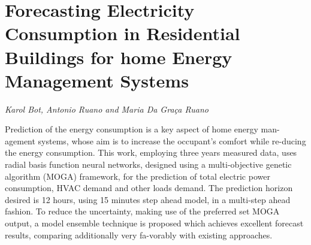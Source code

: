 \documentclass[../booklet.tex]{subfiles}
\begin{document}
\section[Forecasting Electricity Consumption in Residential Buildings for home Energy Management Systems. {\it Karol Bot, Antonio Ruano and Maria Da Graça Ruano}]{Forecasting Electricity Consumption in Residential Buildings for home Energy Management Systems}
  

\begin{center}
  {\it Karol Bot, Antonio Ruano and Maria Da Graça Ruano}
\end{center}

\vskip 0.8cm

Prediction of the energy consumption is a key aspect of home energy man-agement systems, whose aim is to increase the occupant's comfort while re-ducing the energy consumption. This work, employing three years measured data, uses radial basis function neural networks, designed using a multi-objective genetic algorithm (MOGA) framework, for the prediction of total electric power consumption, HVAC demand and other loads demand. The prediction horizon desired is 12 hours, using 15 minutes step ahead model, in a multi-step ahead fashion. To reduce the uncertainty, making use of the preferred set MOGA output, a model ensemble technique is proposed which achieves excellent forecast results, comparing additionally very fa-vorably with existing approaches.
\end{document}
